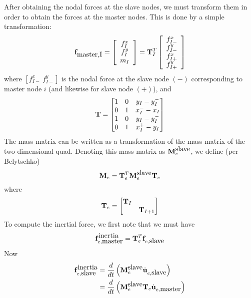 \documentclass{article}
\begin{document}
After obtaining the nodal forces at the slave nodes, we must transform them in order to obtain the forces at the master nodes.
This is done by a simple transformation:
\begin{equation} {\bf f}_{\mbox{master,I}} = \left[ \begin{array}{c} f_I^x \\ f_I^y \\ m_I \end{array} \right] = {\bf T}_I^T \left[ \begin{array}{c} f_{I-}^x \\  f_{I-}^y \\ f_{I+}^x \\  f_{I+}^y \end{array} \right]  \label{eq:eq8200} \end{equation}
where $ \left[ f_{I-}^x \ f_{I-}^y \right]$ is the nodal force at the slave node $(-)$ corresponding to master node $i$ (and likewise for slave node $(+)$), and 
\begin{equation} {\bf T} = \begin{bmatrix} 
1 & 0 & y_I - y_I^- \\
0 & 1 & x_I^- - x_I \\
1 & 0 & y_I - y_I^- \\
0 & 1 & x_I^+ - y_I 
\end{bmatrix} \label{eq:eq8300} \end{equation}
The mass matrix can be written as a transformation of the mass matrix of the two-dimensional quad. 
Denoting this mass matrix as ${\bf M}^{\mbox{slave}}_e$, we define (per Belytschko)
\begin{equation} {\bf M}_e = {\bf T}_e^T {\bf M}^{\mbox{slave}}_e  {\bf T}_e  \label{eq:eq8400} \end{equation}
where
\begin{equation}  {\bf T}_e =  \begin{bmatrix}  
{\bf T}_I &  \\
            & {\bf T}_{I+1} 
\end{bmatrix}  \label{eq:eq8500} \end{equation}
To compute the inertial force, we first note that we must have
\begin{equation}  {\bf f}^{\mbox{inertia}}_{e, \mbox{master}} = {\bf T}_e^T{\bf f}_{e, \mbox{slave}} \label{eq:eq8600} \end{equation}
Now 
\begin{align}
{\bf f}^{\mbox{inertia}}_{e, \mbox{slave}} &= \frac{d}{dt}\left({\bf M}^{\mbox{slave}}_e \dot{\bf u}_{e,\mbox{slave}} \right) \nonumber \\
                          &= \frac{d}{dt}\left({\bf M}^{\mbox{slave}}_e {\bf T}_e \dot{\bf u}_{e,\mbox{master}} \right)
 \label{eq:eq8700}
\end{align}
\end{document}
